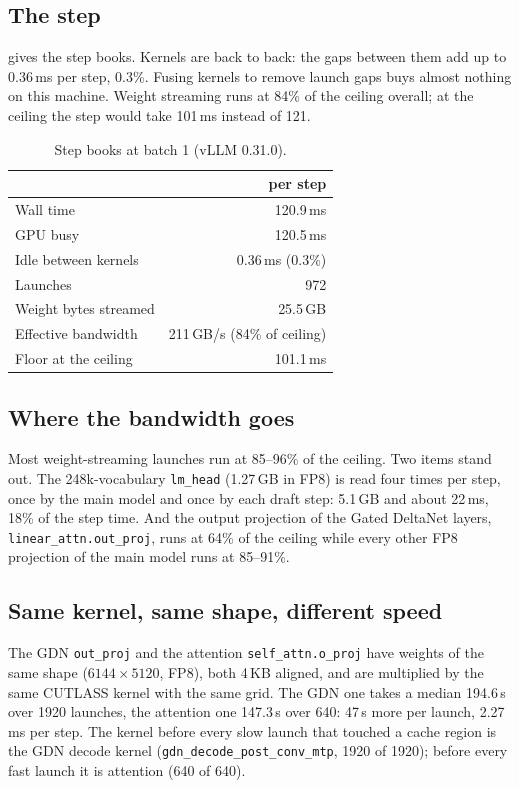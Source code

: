 \subsection{The step}

 gives the step books. Kernels are back to back: the gaps between them add up to
0.36\,ms per step, 0.3\%. Fusing kernels to remove launch gaps buys almost nothing on this
machine. Weight streaming runs at 84\% of the ceiling overall; at the ceiling the step would take
101\,ms instead of 121.

\begin{table}[t]
\centering\small
\begin{tabular}{@{}lr@{}}
\toprule
 & per step \\
\midrule
Wall time & 120.9\,ms \\
GPU busy & 120.5\,ms \\
Idle between kernels & 0.36\,ms (0.3\%) \\
Launches & 972 \\
Weight bytes streamed & 25.5\,GB \\
Effective bandwidth & 211\,GB/s (84\% of ceiling) \\
Floor at the ceiling & 101.1\,ms \\
\bottomrule
\end{tabular}
\caption{Step books at batch 1 (vLLM 0.31.0).}\label{tab:step}
\end{table}

\subsection{Where the bandwidth goes}

Most weight-streaming launches run at 85--96\% of the ceiling. Two items stand out. The
248k-vocabulary \texttt{lm\_head} (1.27\,GB in FP8) is read four times per step, once by the main
model and once by each draft step: 5.1\,GB and about 22\,ms, 18\% of the step time. And the output
projection of the Gated DeltaNet layers, \texttt{linear\_attn.out\_proj}, runs at 64\% of the
ceiling while every other FP8 projection of the main model runs at 85--91\%.

\subsection{Same kernel, same shape, different speed}\label{sec:split}

The GDN \texttt{out\_proj} and the attention \texttt{self\_attn.o\_proj} have weights of the same
shape ($6144\times5120$, FP8), both 4\,KB aligned, and are multiplied by the same CUTLASS kernel
with the same grid. The GDN one takes a median 194.6\,\textmu s over 1920 launches, the attention
one 147.3\,\textmu s over 640: 47\,\textmu s more per launch, 2.27\,ms per step. The kernel before
every slow launch that touched a cache region is the GDN decode kernel
(\texttt{gdn\_decode\_post\_conv\_mtp}, 1920 of 1920); before every fast launch it is attention
(640 of 640).

